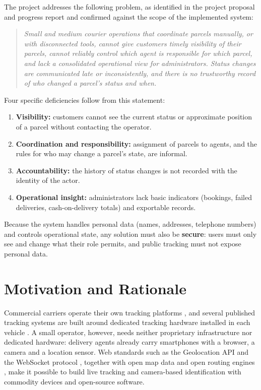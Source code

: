 The project addresses the following problem, as identified in the project proposal and progress report and confirmed against the scope of the implemented system:

\begin{quote}
\emph{Small and medium courier operations that coordinate parcels manually, or with disconnected tools, cannot give customers timely visibility of their parcels, cannot reliably control which agent is responsible for which parcel, and lack a consolidated operational view for administrators. Status changes are communicated late or inconsistently, and there is no trustworthy record of who changed a parcel's status and when.}
\end{quote}

Four specific deficiencies follow from this statement:
\begin{enumerate}
  \item \textbf{Visibility:} customers cannot see the current status or approximate position of a parcel without contacting the operator.
  \item \textbf{Coordination and responsibility:} assignment of parcels to agents, and the rules for who may change a parcel's state, are informal.
  \item \textbf{Accountability:} the history of status changes is not recorded with the identity of the actor.
  \item \textbf{Operational insight:} administrators lack basic indicators (bookings, failed deliveries, cash-on-delivery totals) and exportable records.
\end{enumerate}

Because the system handles personal data (names, addresses, telephone numbers) and controls operational state, any solution must also be \textbf{secure}: users must only see and change what their role permits, and public tracking must not expose personal data.

\section{Motivation and Rationale}
\label{sec:motivation}

Commercial carriers operate their own tracking platforms \cite{dhltracking,pathaocourier}, and several published tracking systems are built around dedicated tracking hardware installed in each vehicle \cite{lee2014vehicle,elmedany2014tracking}. A small operator, however, needs neither proprietary infrastructure nor dedicated hardware: delivery agents already carry smartphones with a browser, a camera and a location sensor. Web standards such as the Geolocation API \cite{w3cgeolocation} and the WebSocket protocol \cite{rfc6455}, together with open map data \cite{haklay2008osm} and open routing engines \cite{luxen2011osrm}, make it possible to build live tracking and camera-based identification with commodity devices and open-source software.

